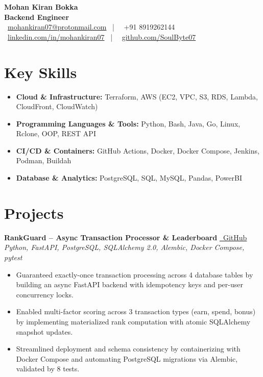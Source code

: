 \documentclass[10pt, letterpaper]{article}
\begin{document}
\pagestyle{empty}

\begin{center}
    {\LARGE \textbf{Mohan Kiran Bokka}} \\
    \vspace{2pt}
    {\large \textbf{Backend Engineer}} \\
    \faEnvelope\ \href{mailto:mohankiran07@protonmail.com}{mohankiran07@protonmail.com} \ | \ \faPhone\ +91 8919262144 \\
    \faLinkedin\ \href{https://linkedin.com/in/mohankiran07}{linkedin.com/in/mohankiran07} \ | \ \faGithub\ \href{https://github.com/SoulByte07}{github.com/SoulByte07}
\end{center}

\section{Key Skills}
\begin{itemize}
    \item \textbf{Cloud \& Infrastructure:} Terraform, AWS (EC2, VPC, S3, RDS, Lambda, CloudFront, CloudWatch)
    \item \textbf{Programming Languages \& Tools:} Python, Bash, Java, Go, Linux, Rclone, OOP, REST API
    \item \textbf{CI/CD \& Containers:} GitHub Actions, Docker, Docker Compose, Jenkins, Podman, Buildah
    \item \textbf{Database \& Analytics:} PostgreSQL, SQL, MySQL, Pandas, PowerBI
\end{itemize}

\section{Projects}


\noindent \textbf{RankGuard – Async Transaction Processor \& Leaderboard} \href{https://github.com/SoulByte07/RankGuard}{\faGithub\ GitHub} \\
\textit{Python, FastAPI, PostgreSQL, SQLAlchemy 2.0, Alembic, Docker Compose, pytest}
\begin{itemize}
    \item Guaranteed exactly-once transaction processing across 4 database tables by building an async FastAPI backend with idempotency keys and per-user concurrency locks.
    \item Enabled multi-factor scoring across 3 transaction types (earn, spend, bonus) by implementing materialized rank computation with atomic SQLAlchemy snapshot updates.
    \item Streamlined deployment and schema consistency by containerizing with Docker Compose and automating PostgreSQL migrations via Alembic, validated by 8 tests.
\end{itemize}
\end{document}

